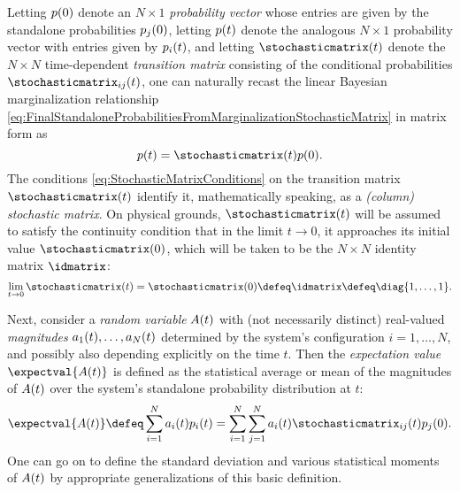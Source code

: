 \documentclass[12pt,english,prl,superscriptaddress,nobibnotes,nofootinbib]{revtex4-2}
\let\originalleft\left
\let\originalright\right
\renewcommand{\left}{\mathopen{}\mathclose\bgroup\originalleft}
\renewcommand{\right}{\aftergroup\egroup\originalright}
\begin{document}
Letting $p\left(0\right)$ denote an $N\times1$ \emph{probability vector}
whose entries are given by the standalone probabilities $p_{j}\left(0\right)$,
letting $p\left(t\right)$ denote the analogous $N\times1$ probability
vector with entries given by $p_{i}\left(t\right)$, and letting $\stochasticmatrix\left(t\right)$
denote the $N\times N$ time-dependent \emph{transition matrix} consisting
of the conditional probabilities $\stochasticmatrix_{ij}\left(t\right)$,
one can naturally recast the linear Bayesian marginalization relationship
\eqref{eq:FinalStandaloneProbabilitiesFromMarginalizationStochasticMatrix}
in matrix form as 
\begin{equation}
p\left(t\right)=\stochasticmatrix\left(t\right)p\left(0\right).\label{eq:MatrixFormStochasticMap}
\end{equation}
 The conditions \eqref{eq:StochasticMatrixConditions} on the transition
matrix $\stochasticmatrix\left(t\right)$ identify it, mathematically
speaking, as a \emph{(column) stochastic matrix}. On physical grounds,
$\stochasticmatrix\left(t\right)$ will be assumed to satisfy the
continuity condition that in the limit $t\to0$, it approaches its
initial value $\stochasticmatrix\left(0\right)$, which will be taken
to be the $N\times N$ identity matrix $\idmatrix$: 
\begin{equation}
\lim_{t\to0}\stochasticmatrix\left(t\right)=\stochasticmatrix\left(0\right)\defeq\idmatrix\defeq\diag{1,\dots,1}.\label{eq:ContinuityConditionStochasticMatrixAtTimeZero}
\end{equation}

Next, consider a \emph{random variable} $A\left(t\right)$ with (not
necessarily distinct) real-valued \emph{magnitudes} $a_{1}\left(t\right),\dots,a_{N}\left(t\right)$
determined by the system's configuration $i=1,\dots,N$, and possibly
also depending explicitly on the time $t$. Then the \emph{expectation value}
$\expectval{A\left(t\right)}$ is defined as the statistical average
or mean of the magnitudes of $A\left(t\right)$ over the system's
standalone probability distribution at $t$: 
\begin{equation}
\expectval{A\left(t\right)}\defeq\sum_{i=1}^{N}a_{i}\left(t\right)p_{i}\left(t\right)=\sum_{i=1}^{N}\sum_{j=1}^{N}a_{i}\left(t\right)\stochasticmatrix_{ij}\left(t\right)p_{j}\left(0\right).\label{eq:DefRandomVariableExpectationValue}
\end{equation}
 One can go on to define the standard deviation and various statistical
moments of $A\left(t\right)$ by appropriate generalizations of this
basic definition.
\end{document}
